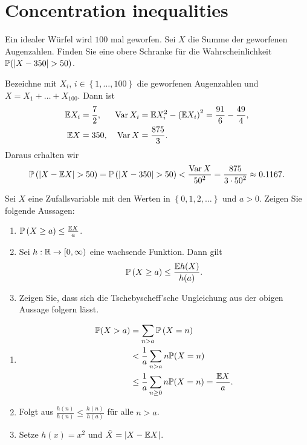 \section{Concentration inequalities}

 Ein idealer Würfel
wird $100$ mal geworfen. Sei $X$ die Summe der geworfenen Augenzahlen. Finden
Sie eine obere Schranke für die Wahrscheinlichkeit $\mathbb P( | X - 350 | > 50)$. 

\solution Bezeichne mit $X_i$, $i\in \left\{ 1,\dots ,100 \right\}$ die geworfenen
Augenzahlen und $X= X_1 +\dots + X_{100}$. Dann ist
\begin{align*}
    \mathbb E X_i &= \frac{7}{2}, & \operatorname{Var} X_i &= \mathbb E X_i^{2} - \left( \mathbb E X_i \right)^{2} = \frac{91}{6} - \frac{49}{4}, \\
    \mathbb E X &= 350, & \operatorname{Var} X &= \frac{875}{3}.
\end{align*}
Daraus erhalten wir
\begin{equation*}
    \mathbb P \left( | X - \mathbb E X | > 50 \right) = \mathbb P \left( | X - 350  | > 50 \right) < \frac{\operatorname{Var} X}{ {50}^2 } = \frac{875}{ 3 \cdot {50}^{2}} \approx 0.1167.
\end{equation*}

 Sei $X$ eine Zufallsvariable
mit den Werten in $\left\{ 0,1,2,\dots \right\}$ und $a> 0$. Zeigen Sie folgende Aussagen:
\begin{enumerate}
    \item $\mathbb P \left( X \geq a \right) \leq \frac{\mathbb E X}{a}$.

    \item Sei $h: \mathbb R \to [0,\infty)$ eine wachsende Funktion. Dann gilt
        \begin{equation*}
            \mathbb P \left( X \geq a \right) \leq \frac{\mathbb E h(X)}{ h(a)}. 
        \end{equation*}

    \item Zeigen Sie, dass sich die Tschebyscheff'sche Ungleichung aus der
        obigen Aussage folgern lässt. 
\end{enumerate}

\solution
\begin{enumerate}
    \item \begin{align*}
            \mathbb P( X > a ) &= \sum_{n > a} \mathbb P \left( X = n \right) \\
            &< \frac{1}{a} \sum_{n>a} n \mathbb P( X = n ) \\
            &\leq \frac{1}{a} \sum_{n \geq 0} n \mathbb P(X = n) = \frac{\mathbb E X}{ a}.
        \end{align*}
    \item Folgt aus $\frac{h(n)}{h(n)} \leq \frac{h(n)}{h(a)}$ für alle $n>a$.
    \item Setze $h(x) = x^{2}$ und $\tilde X = | X - \mathbb E X |$.
\end{enumerate}


